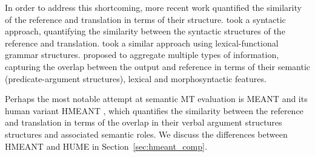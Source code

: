 \documentclass[11pt]{article}
\newcommand{\secref}[1]{Section~\ref{#1}}
\def\parcite#1{\cite{#1}}
\begin{document}

In order to address this shortcoming, more recent work quantified
the similarity of the reference and translation in terms
of their structure.  took a syntactic approach, 
quantifying the similarity between the syntactic structures of the reference and translation.
 took a similar approach using lexical-functional grammar structures.
 proposed to aggregate multiple types of information,
capturing the overlap between the output and reference in terms of their
semantic (predicate-argument structures), lexical and morphosyntactic features.

Perhaps the most notable attempt at semantic MT evaluation is MEANT and
its human variant HMEANT \parcite{lo2011structured}, which quantifies the similarity between
the reference and translation in terms of the overlap in
their verbal argument structures structures and associated semantic roles.
We discuss the differences between HMEANT and HUME in \secref{sec:hmeant_comp}.
\end{document}
